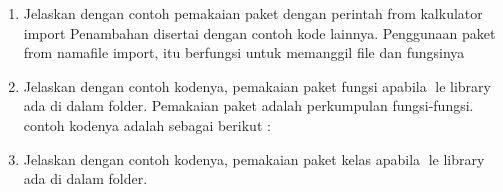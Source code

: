 \begin{enumerate}
\begin{itemize}
    \end{itemize}
    

    \item Jelaskan dengan contoh pemakaian paket dengan perintah from kalkulator import Penambahan disertai dengan contoh kode lainnya.
    Penggunaan paket from namafile import, itu berfungsi untuk memanggil file dan fungsinya
    

    \item Jelaskan dengan contoh kodenya, pemakaian paket fungsi apabila le library ada di dalam folder.
    Pemakaian paket adalah perkumpulan fungsi-fungsi. contoh kodenya adalah sebagai berikut :
    \item Jelaskan dengan contoh kodenya, pemakaian paket kelas apabila le library ada di dalam folder.
    
\end{enumerate}

